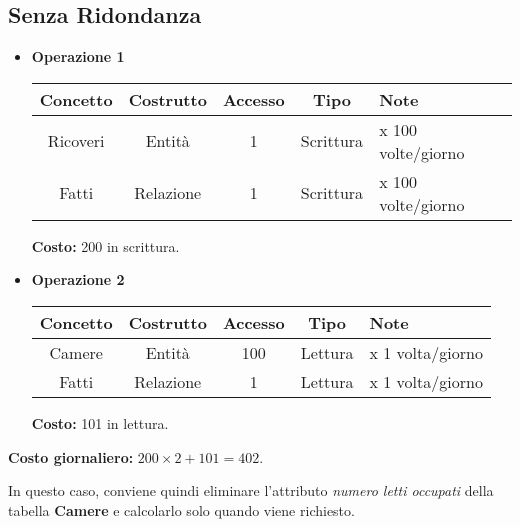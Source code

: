 \documentclass[a4paper, 10pt]{article}
\begin{document}
\subsection*{Senza Ridondanza}
\begin{itemize}
    \item \textbf{Operazione 1}
    \begin{table}[H]
        \centering
        \begin{tabular}{|c|c|c|c|l|}
            \hline
            \textbf{Concetto} & \textbf{Costrutto} & \textbf{Accesso} & \textbf{Tipo} & \textbf{Note} \\ 
            \hline
            Ricoveri & Entità  & 1 & Scrittura & x 100 volte/giorno \\ \hline
            Fatti    & Relazione & 1 & Scrittura & x 100 volte/giorno \\ \hline
        \end{tabular}
    \end{table}
    \textbf{Costo:} 200 in scrittura.

    \item \textbf{Operazione 2}
    \begin{table}[H]
        \centering
        \begin{tabular}{|c|c|c|c|l|}
            \hline
            \textbf{Concetto} & \textbf{Costrutto} & \textbf{Accesso} & \textbf{Tipo} & \textbf{Note} \\ 
            \hline
            Camere  & Entità    & 100 & Lettura & x 1 volta/giorno \\ \hline
            Fatti   & Relazione & 1   & Lettura & x 1 volta/giorno \\ \hline
        \end{tabular}
    \end{table}
    \textbf{Costo:} 101 in lettura.
\end{itemize}

\textbf{Costo giornaliero:} \( 200 \times 2 + 101 = 402 \).

In questo caso, conviene quindi eliminare l'attributo \textit{numero letti 
occupati} della tabella \textbf{Camere} e calcolarlo solo quando viene richiesto.
\end{document}

